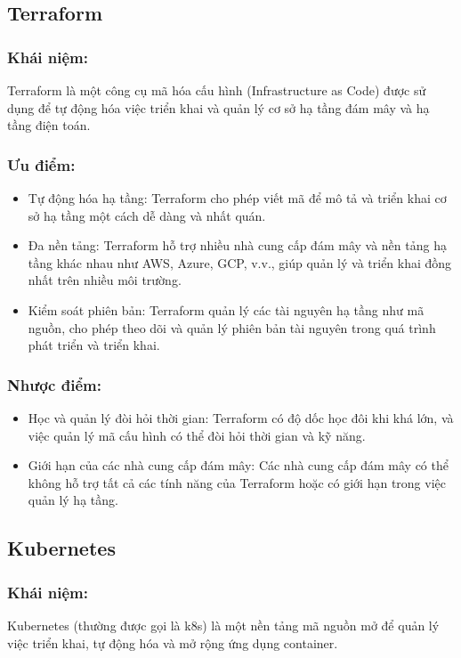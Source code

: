 \subsection{Terraform}
\subsubsection{Khái niệm:}
\indent Terraform là một công cụ mã hóa cấu hình (Infrastructure as Code) được sử dụng để tự động hóa việc triển khai và quản lý cơ sở hạ tầng đám mây và hạ tầng điện toán.
\subsubsection{Ưu điểm:}
\begin{itemize}
    \item Tự động hóa hạ tầng: 
    Terraform cho phép viết mã để mô tả và triển khai cơ sở hạ tầng một cách dễ dàng và nhất quán.
    \item Đa nền tảng: 
    Terraform hỗ trợ nhiều nhà cung cấp đám mây và nền tảng hạ tầng khác nhau như AWS, Azure, GCP, v.v., giúp quản lý và triển khai đồng nhất trên nhiều môi trường.
    \item Kiểm soát phiên bản: 
    Terraform quản lý các tài nguyên hạ tầng như mã nguồn, cho phép theo dõi và quản lý phiên bản tài nguyên trong quá trình phát triển và triển khai.
\end{itemize}
\subsubsection{Nhược điểm:}
\begin{itemize}
    \item Học và quản lý đòi hỏi thời gian: Terraform có độ dốc học đôi khi khá lớn, và việc quản lý mã cấu hình có thể đòi hỏi thời gian và kỹ năng.
    \item Giới hạn của các nhà cung cấp đám mây: Các nhà cung cấp đám mây có thể không hỗ trợ tất cả các tính năng của Terraform hoặc có giới hạn trong việc quản lý hạ tầng.
\end{itemize}
\subsection{Kubernetes}
\subsubsection{Khái niệm:}
\indent Kubernetes (thường được gọi là k8s) là một nền tảng mã nguồn mở để quản lý việc triển khai, tự động hóa và mở rộng ứng dụng container.

